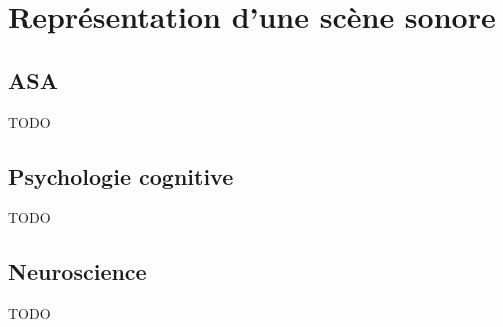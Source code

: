 \chapter{Représentation d’une scène sonore}\label{ch:psycho_ea}
\section{ASA}
TODO
\section{Psychologie cognitive}
TODO
\section{Neuroscience}
TODO
